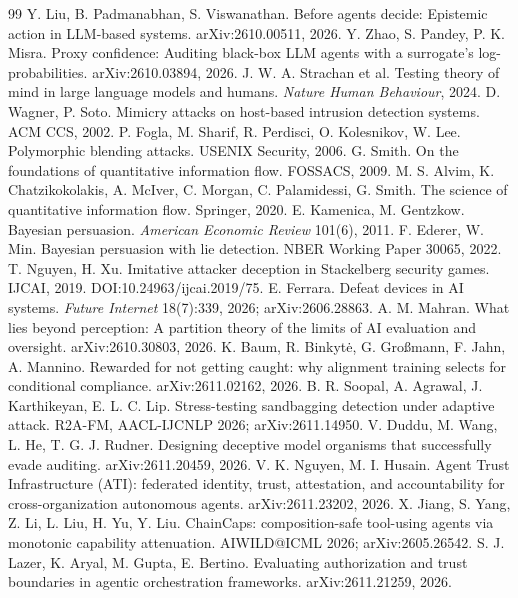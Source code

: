 \documentclass[acmsmall,review,anonymous]{acmart}
\begin{document}
\begin{thebibliography}{99}
 Y. Liu, B. Padmanabhan, S. Viswanathan. Before agents decide: Epistemic action in LLM-based systems. arXiv:2610.00511, 2026.
 Y. Zhao, S. Pandey, P. K. Misra. Proxy confidence: Auditing black-box LLM agents with a surrogate's log-probabilities. arXiv:2610.03894, 2026.
 J. W. A. Strachan et al. Testing theory of mind in large language models and humans. \emph{Nature Human Behaviour}, 2024.
 D. Wagner, P. Soto. Mimicry attacks on host-based intrusion detection systems. ACM CCS, 2002.
 P. Fogla, M. Sharif, R. Perdisci, O. Kolesnikov, W. Lee. Polymorphic blending attacks. USENIX Security, 2006.
 G. Smith. On the foundations of quantitative information flow. FOSSACS, 2009.
 M. S. Alvim, K. Chatzikokolakis, A. McIver, C. Morgan, C. Palamidessi, G. Smith. The science of quantitative information flow. Springer, 2020.
 E. Kamenica, M. Gentzkow. Bayesian persuasion. \emph{American Economic Review} 101(6), 2011.
 F. Ederer, W. Min. Bayesian persuasion with lie detection. NBER Working Paper 30065, 2022.
 T. Nguyen, H. Xu. Imitative attacker deception in Stackelberg security games. IJCAI, 2019. DOI:10.24963/ijcai.2019/75.
 E. Ferrara. Defeat devices in AI systems. \emph{Future Internet} 18(7):339, 2026; arXiv:2606.28863.
 A. M. Mahran. What lies beyond perception: A partition theory of the limits of AI evaluation and oversight. arXiv:2610.30803, 2026.
 K. Baum, R. Binkyt\.{e}, G. Gro{\ss}mann, F. Jahn, A. Mannino. Rewarded for not getting caught: why alignment training selects for conditional compliance. arXiv:2611.02162, 2026.
 B. R. Soopal, A. Agrawal, J. Karthikeyan, E. L. C. Lip. Stress-testing sandbagging detection under adaptive attack. R2A-FM, AACL-IJCNLP 2026; arXiv:2611.14950.
 V. Duddu, M. Wang, L. He, T. G. J. Rudner. Designing deceptive model organisms that successfully evade auditing. arXiv:2611.20459, 2026.
 V. K. Nguyen, M. I. Husain. Agent Trust Infrastructure (ATI): federated identity, trust, attestation, and accountability for cross-organization autonomous agents. arXiv:2611.23202, 2026.
 X. Jiang, S. Yang, Z. Li, L. Liu, H. Yu, Y. Liu. ChainCaps: composition-safe tool-using agents via monotonic capability attenuation. AIWILD@ICML 2026; arXiv:2605.26542.
 S. J. Lazer, K. Aryal, M. Gupta, E. Bertino. Evaluating authorization and trust boundaries in agentic orchestration frameworks. arXiv:2611.21259, 2026.

\end{thebibliography}
\end{document}
